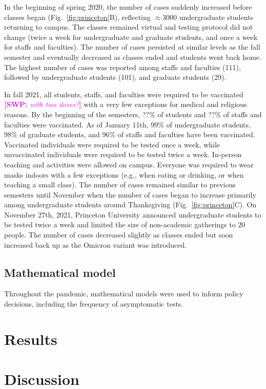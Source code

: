 \documentclass[12pt]{article}
\newcommand{\fref}[1]{Fig.~\ref{fig:#1}}
\newcommand{\comment}[3]{\textcolor{#1}{\textbf{[#2: }\textsl{#3}\textbf{]}}}
\newcommand{\swp}[1]{\comment{magenta}{SWP}{#1}}
\begin{document}
In the beginning of spring 2020, the number of cases suddenly increased before classes began (\fref{princeton}B), reflecting $\approx 3000$ undergraduate students returning to campus.
The classes remained virtual and testing protocol did not change (twice a week for undergraduate and graduate students, and once a week for staffs and faculties).
The number of cases persisted at similar levels as the fall semester and eventually decreased as classes ended and students went back home.
The highest number of cases was reported among staffs and faculties (111), followed by undergraduate students (101), and graduate students (29).

In fall 2021, all students, staffs, and faculties were required to be vaccinated \swp{with two doses?} with a very few exceptions for medical and religious reasons. 
By the beginning of the semesters, ??\% of students and ??\% of staffs and faculties were vaccinated.
As of January 11th, 99\% of undergraduate students, 98\% of graduate students, and 96\% of staffs and faculties have been vaccinated.
Vaccinated individuals were required to be tested once a week, while unvaccinated individuals were required to be tested twice a week.
In-person teaching and activities were allowed on campus.
Everyone was required to wear masks indoors with a few exceptions (e.g., when eating or drinking, or when teaching a small class).
The number of cases remained similar to previous semesters until November when the number of cases began to increase primarily among undergraduate students around Thanksgiving (\fref{princeton}C).  
On November 27th, 2021, Princeton University announced undergraduate students to be tested twice a week and limited the size of non-academic gatherings to 20 people.
The number of cases decreased slightly as classes ended but soon increased back up as the Omicron variant was introduced.

\subsection{Mathematical model}

Throughout the pandemic, mathematical models were used to inform policy decisions, including the frequency of asymptomatic tests.



\section{Results}

\section{Discussion}
\end{document}
